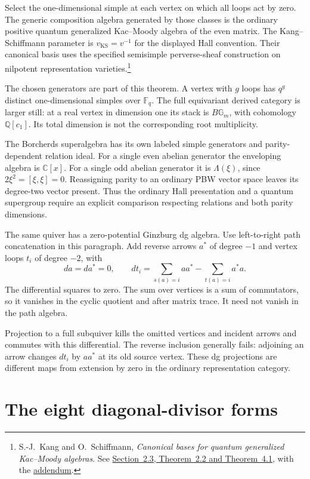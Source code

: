 Select the one-dimensional simple at each vertex on which
all loops act by zero.
The generic composition algebra generated by those classes
is the ordinary positive quantum generalized Kac--Moody
algebra of the even matrix.
The Kang--Schiffmann parameter is \(v_{\mathrm{KS}}=v^{-1}\)
for the displayed Hall convention.
Their canonical basis uses the specified semisimple
perverse-sheaf construction on nilpotent representation
varieties.\footnote{
S.-J.~Kang and O.~Schiffmann,
\emph{Canonical bases for quantum generalized Kac--Moody algebras}.
See \href{https://arxiv.org/abs/math/0311089}
{Section~2.3, Theorem~2.2 and Theorem~4.1}, with the
\href{https://arxiv.org/abs/0711.1948}{addendum}.}

The chosen generators are part of this theorem.
A vertex with \(g\) loops has \(q^g\) distinct
one-dimensional simples over \(\mathbb F_q\).
The full equivariant derived category is larger still:
at a real vertex in dimension one its stack is
\(B\mathbb G_m\), with cohomology \(\mathbb Q[c_1]\).
Its total dimension is not the corresponding root multiplicity.

The Borcherds superalgebra has its own labeled simple
generators and parity-dependent relation ideal.
For a single even abelian generator the enveloping algebra
is \(\mathbb C[x]\).
For a single odd abelian generator it is
\(\Lambda(\xi)\), since \(2\xi^2=[\xi,\xi]=0\).
Reassigning parity to an ordinary PBW vector space leaves
its degree-two vector present.
Thus the ordinary Hall presentation and a quantum
supergroup require an explicit comparison respecting
relations and both parity dimensions.

The same quiver has a zero-potential Ginzburg dg algebra.
Use left-to-right path concatenation in this paragraph.
Add reverse arrows \(a^*\) of degree \(-1\) and vertex
loops \(t_i\) of degree \(-2\), with
\[
 da=da^*=0,\qquad
 dt_i=\sum_{s(a)=i}aa^*-\sum_{t(a)=i}a^*a.
\]
The differential squares to zero.
The sum over vertices is a sum of commutators, so it
vanishes in the cyclic quotient and after matrix trace.
It need not vanish in the path algebra.

Projection to a full subquiver kills the omitted vertices
and incident arrows and commutes with this differential.
The reverse inclusion generally fails: adjoining an arrow
changes \(dt_i\) by \(aa^*\) at its old source vertex.
These dg projections are different maps from extension
by zero in the ordinary representation category.

\section{The eight diagonal-divisor forms}

